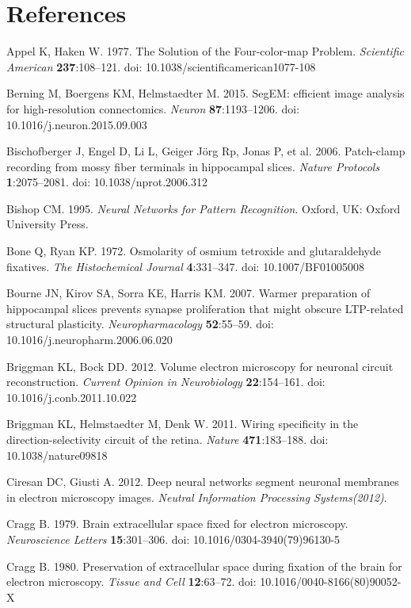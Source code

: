 \documentclass{article}
\begin{document}
\section*{References}
\begin{hangpars}\small
Appel K, Haken W. 1977. The Solution of the Four-color-map Problem. \emph{Scientific American} \textbf{237}:108–121. doi: 10.1038/scientificamerican1077-108

Berning M, Boergens KM, Helmstaedter M. 2015. SegEM: efficient image analysis for high-resolution connectomics. \emph{Neuron} \textbf{87}:1193–1206. doi: 10.1016/j.neuron.2015.09.003

Bischofberger J, Engel D, Li L, Geiger Jörg Rp, Jonas P, et al. 2006. Patch-clamp recording from mossy fiber terminals in hippocampal slices. \emph{Nature Protocols} \textbf{1}:2075–2081. doi: 10.1038/nprot.2006.312

Bishop CM. 1995. \emph{Neural Networks for Pattern Recognition}. Oxford, UK: Oxford University Press.

Bone Q, Ryan KP. 1972. Osmolarity of osmium tetroxide and glutaraldehyde fixatives. \emph{The Histochemical Journal} \textbf{4}:331–347. doi: 10.1007/BF01005008

Bourne JN, Kirov SA, Sorra KE, Harris KM. 2007. Warmer preparation of hippocampal slices prevents synapse proliferation that might obscure LTP-related structural plasticity. \emph{Neuropharmacology} \textbf{52}:55–59. doi: 10.1016/j.neuropharm.2006.06.020

Briggman KL, Bock DD. 2012. Volume electron microscopy for neuronal circuit reconstruction. \emph{Current Opinion in Neurobiology} \textbf{22}:154–161. doi: 10.1016/j.conb.2011.10.022

Briggman KL, Helmstaedter M, Denk W. 2011. Wiring specificity in the direction-selectivity circuit of the retina. \emph{Nature} \textbf{471}:183–188. doi: 10.1038/nature09818

Ciresan DC, Giusti A. 2012. Deep neural networks segment neuronal membranes in electron microscopy images. \emph{Neutral Information Processing Systems(2012)}.

Cragg B. 1979. Brain extracellular space fixed for electron microscopy. \emph{Neuroscience Letters} \textbf{15}:301–306. doi: 10.1016/0304-3940(79)96130-5

Cragg B. 1980. Preservation of extracellular space during fixation of the brain for electron microscopy. \emph{Tissue and Cell} \textbf{12}:63–72. doi: 10.1016/0040-8166(80)90052-X


\end{hangpars}
\end{document}
